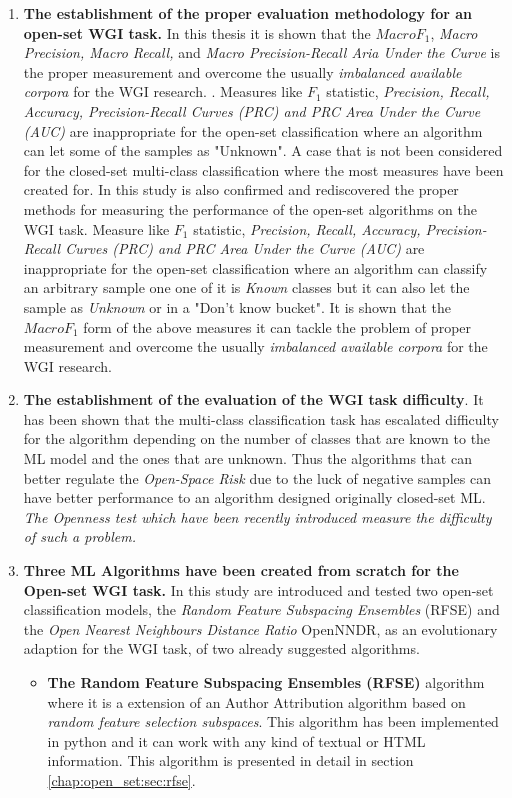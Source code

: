 \begin{enumerate}
\item \textbf{The establishment of the proper evaluation methodology for an open-set WGI task.} In this thesis it is shown that the $Macro F_{1}$, \textit{Macro Precision, Macro Recall,} and \textit{Macro Precision-Recall Aria Under the Curve} is the proper measurement and overcome the usually \textit{imbalanced available corpora} for the WGI research. . Measures like $F_{1}$ statistic, \textit{Precision, Recall, Accuracy, Precision-Recall Curves (PRC) and PRC Area Under the Curve (AUC)} are inappropriate for the open-set classification where an algorithm can let some of the samples as "Unknown". A case that is not been considered for the closed-set multi-class classification where the most measures have been created for. In this study is also confirmed and rediscovered the proper methods for measuring the performance of the open-set algorithms on the WGI task. Measure like $F_{1}$ statistic, \textit{Precision, Recall, Accuracy, Precision-Recall Curves (PRC) and PRC Area Under the Curve (AUC)} are inappropriate for the open-set classification where an algorithm can classify an arbitrary sample one one of it is \textit{Known} classes but it can also let the sample as \textit{Unknown} or in a "Don't know bucket". It is shown that the $Macro F_{1}$ form of the above measures it can tackle the problem of proper measurement and overcome the usually \textit{imbalanced available corpora} for the WGI research. 
\item \textbf{The establishment of the evaluation of the WGI task difficulty}. It has been shown that the multi-class classification task has escalated difficulty for the algorithm depending on the number of classes that are known to the ML model and the ones that are unknown. Thus the algorithms that can better regulate the \textit{Open-Space Risk} due to the luck of negative samples can have better performance to an algorithm designed originally closed-set ML. \textit{The Openness test which have been recently introduced measure the difficulty of such a problem.}
\item \textbf{Three ML Algorithms have been created from scratch for the Open-set WGI task.} In this study are introduced and tested two open-set classification models, the \textit{Random Feature Subspacing Ensembles} (RFSE) and the \textit{Open Nearest Neighbours Distance Ratio} OpenNNDR, as an evolutionary adaption for the WGI task, of two already suggested algorithms. 
\begin{itemize}
\item \textbf{The Random Feature Subspacing Ensembles (RFSE)} algorithm where it is a extension of an Author Attribution algorithm based on \textit{random feature selection subspaces}. This algorithm has been implemented in python and it can work with any kind of textual or HTML information. This algorithm is presented in detail in section \ref{chap:open_set:sec:rfse}.

\end{itemize}
\end{enumerate}
